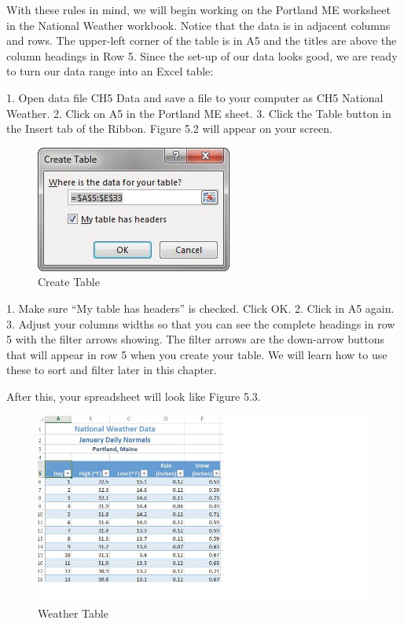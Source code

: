 With these rules in mind, we will begin working on the Portland ME worksheet in the National
Weather workbook. Notice that the data is in adjacent columns and rows. The upper-left corner of
the table is in A5 and the titles are above the column headings in Row 5. Since the set-up of our data
looks good, we are ready to turn our data range into an Excel table:

1. Open data file CH5 Data and save a file to your computer as CH5 National Weather.
2. Click on A5 in the Portland ME sheet.
3. Click the Table button in the Insert tab of the Ribbon.
Figure 5.2 will appear on your screen.


\begin{figure}[H]
	\centering
	\includegraphics[width=\maxwidth{.95\linewidth}]{gfx/ch05_fig02}
	\caption{Create Table}
	\label{05:fig02}
\end{figure}





1. Make sure “My table has headers” is checked. Click OK.
2. Click in A5 again.
3. Adjust your columns widths so that you can see the complete headings in row 5 with the filter
arrows showing. The filter arrows are the down-arrow buttons that will appear in row 5 when
you create your table. We will learn how to use these to sort and filter later in this chapter.

After this, your spreadsheet will look like Figure 5.3.


\begin{figure}[H]
	\centering
	\includegraphics[width=\maxwidth{.95\linewidth}]{gfx/ch05_fig03}
	\caption{Weather Table}
	\label{05:fig03}
\end{figure}






